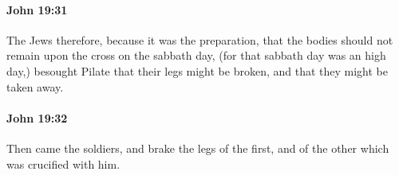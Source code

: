 		\paragraph{John 19:31} %
			\label{JOHN-19-31}

			The Jews therefore, because it was the preparation, that the bodies should not remain upon the cross on the sabbath day, (for that sabbath day was an high day,) besought Pilate that their legs might be broken, and that they might be taken away.

			\begin{framed}
				\scriptsize
				\begin{compactdesc}
					\item[SBLG] 
				\end{compactdesc}
			\end{framed}

		\paragraph{John 19:32} %
			\label{JOHN-19-32}

			Then came the soldiers, and brake the legs of the first, and of the other which was crucified with him.

